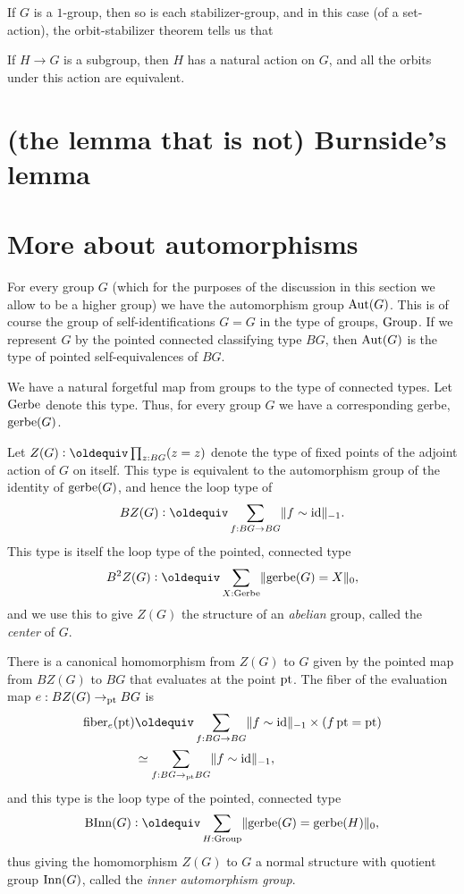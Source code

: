 If $G$ is a $1$-group,
then so is each stabilizer-group,
and in this case (of a set-action),
the orbit-stabilizer theorem
tells us that 

\begin{theorem}
  If $H \to G$ is a subgroup, then $H$ has a natural action on $G$,
  and all the orbits under this action are equivalent.
\end{theorem}

\section{(the lemma that is not) Burnside's lemma}
\label{sec:burnsides-lemma}

\section{More about automorphisms}
\label{sec:automorphisms}

For every group $G$ (which for the purposes of the discussion
in this section we allow to be a higher group)
we have the automorphism group $\operatorname{Aut}(G)$.
This is of course the group of self-identifications $G = G$ in the type of groups, $\mathord{\mathrm{Group}}$.
If we represent $G$ by the pointed connected classifying type $BG$,
then $\operatorname{Aut}(G)$ is the type of pointed self-equivalences of $BG$.

We have a natural forgetful map from groups to the type of connected types.
Let $\mathord{\mathrm{Gerbe}}$ denote this type.
Thus, for every group $G$ we have a corresponding gerbe, $\operatorname{gerbe}(G)$.

\begin{definition}
  Let $Z(G) \defeq \prod_{z : BG}(z = z)$ denote the type of fixed points of the adjoint action of $G$ on itself.
  This type is equivalent to the automorphism group of the identity of $\operatorname{gerbe}(G)$,
  and hence the loop type of
  \[
    BZ(G) \defeq \sum_{f : BG \to BG} \merely{f \sim \id}.
  \]
  This type is itself the loop type of the pointed, connected type
  \[
    B^2Z(G) \defeq \sum_{X : \Gerbe}\Trunc{\gerbe(G) = X}_0,
  \]
  and we use this to give $Z(G)$ the structure of an \emph{abelian} group,
  called the \emph{center} of $G$.
\end{definition}
There is a canonical homomorphism from $Z(G)$ to $G$ given by the pointed map
from $BZ(G)$ to $BG$ that evaluates at the point ${\mathord{\mathrm{pt}}}$.
The fiber of the evaluation map $e : BZ(G) \to_{\mathord{\mathrm{pt}}} BG$ is
\begin{align*}
  \fiber_e(\pt)
  &\jdeq \sum_{f : BG \to BG} \merely{f \sim \id} \times (\mathop f \pt = \pt) \\
  &\equiv \sum_{f : BG \to_\pt BG} \merely{f \sim \id},
\end{align*}
and this type is the loop type of the pointed, connected type
\[
  \B\Inn(G) \defeq \sum_{H : \Group} \Trunc{\gerbe(G) = \gerbe(H)}_0,
\]
thus giving the homomorphism $Z(G)$ to $G$ a normal structure with
quotient group $\operatorname{Inn}(G)$, called the \emph{inner automorphism group}.

